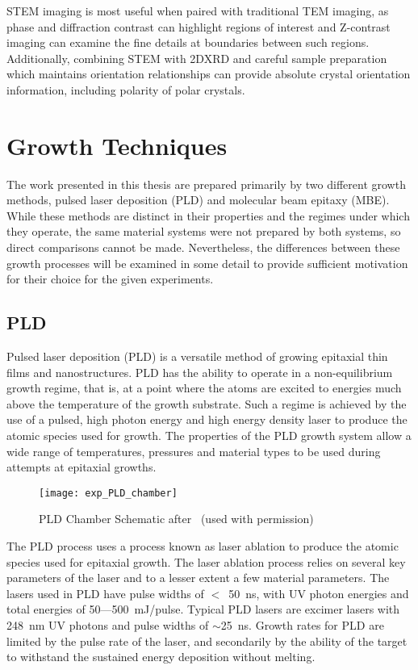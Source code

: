 STEM imaging is most useful when paired with traditional TEM imaging, as phase and diffraction contrast can highlight regions of interest and Z-contrast imaging can examine the fine details at boundaries between such regions.
Additionally, combining STEM with 2DXRD and careful sample preparation which maintains orientation relationships can provide absolute crystal orientation information, including polarity of polar crystals.

\section{Growth Techniques}
The work presented in this thesis are prepared primarily by two different growth methods, pulsed laser deposition (PLD) and molecular beam epitaxy (MBE).
While these methods are distinct in their properties and the regimes under which they operate, the same material systems were not prepared by both systems, so direct comparisons cannot be made.
Nevertheless, the differences between these growth processes will be examined in some detail to provide sufficient motivation for their choice for the given experiments.
\subsection{PLD} Pulsed laser deposition (PLD) is a versatile method of growing epitaxial thin films and nanostructures.
PLD has the ability to operate in a non-equilibrium growth regime, that is, at a point where the atoms are excited to energies much above the temperature of the growth substrate.
Such a regime is achieved by the use of a pulsed, high photon energy and high energy density laser to produce the atomic species used for growth.
The properties of the PLD growth system allow a wide range of temperatures, pressures and material types to be used during attempts at epitaxial growths.
\begin{figure}
 \centering \texttt{[image: exp\_PLD\_chamber]}
 \caption{\label{fig:exp_pld_chamber}PLD Chamber Schematic after~\cite{stephen-thesis} (used with permission)}
\end{figure}

The PLD process uses a process known as laser ablation to produce the atomic species used for epitaxial growth.
The laser ablation process relies on several key parameters of the laser and to a lesser extent a few material parameters.
The lasers used in PLD have pulse widths of \(<\)~50~ns, with UV photon energies and total energies of 50---500~mJ/pulse.
Typical PLD lasers are excimer lasers with 248~nm UV photons and pulse widths of \(\sim\)25~ns.
Growth rates for PLD are limited by the pulse rate of the laser, and secondarily by the ability of the target to withstand the sustained energy deposition without melting.

